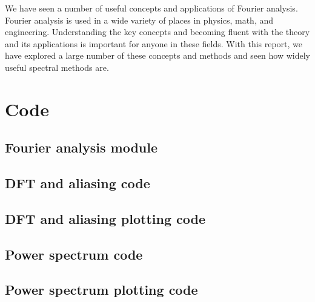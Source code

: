 \documentclass[twocolumn]{myarticle}
\begin{document}
We have seen a number of useful concepts and applications of Fourier analysis.
Fourier analysis is used in a wide variety of places in physics, math, and engineering.
Understanding the key concepts and becoming fluent with the theory and its applications is important for anyone in these fields.
With this report, we have explored a large number of these concepts and methods and seen how widely useful spectral methods are.

\onecolumn

\section{Code}
\label{sec:code}

\subsection{Fourier analysis module}
\label{subsec:fourier_analysis_module}


\vspace{10pt}

\subsection{DFT and aliasing code}
\label{subsec:dft_and_aliasing_code}


\vspace{10pt}

\subsection{DFT and aliasing plotting code}
\label{subsec:dft_and_aliasing_plotting_code}


\vspace{10pt}

\subsection{Power spectrum code}
\label{subsec:power_spectrum_code}


\vspace{10pt}

\subsection{Power spectrum plotting code}
\label{subsec:power_spectrum_plotting_code}


\vspace{10pt}
\end{document}
